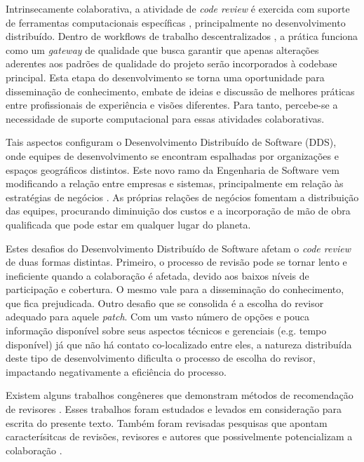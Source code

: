 \documentclass[a4paper,12pt]{monografia}
\theoremstyle{plain}
\theoremstyle{definition}
\theoremstyle{remark}
\begin{document}
Intrinsecamente colaborativa, a atividade de \textit{code review} é exercida com suporte de ferramentas computacionais específicas \cite{Bacchelli2013}, principalmente no desenvolvimento distribuído. Dentro de workflows de trabalho descentralizados \cite{gousios2016}, a prática funciona como um \textit{gateway} de qualidade que busca garantir que apenas alterações aderentes aos padrões de qualidade do projeto serão incorporados à codebase principal. Esta etapa do desenvolvimento se torna uma oportunidade para disseminação de conhecimento, embate de ideias e discussão de melhores práticas entre profissionais de experiência e visões diferentes. Para tanto, percebe-se a necessidade de suporte computacional para essas atividades colaborativas.

Tais aspectos configuram o Desenvolvimento Distribuído de Software (DDS), onde equipes de desenvolvimento se encontram espalhadas por organizações e espaços geográficos distintos. Este novo ramo da Engenharia de Software vem modificando a relação entre empresas e sistemas, principalmente em relação às estratégias de negócios \cite{audy2007}. As próprias relações de negócios fomentam a distribuição das equipes, procurando diminuição dos custos e a incorporação de mão de obra qualificada que pode estar em qualquer lugar do planeta.


Estes desafios do Desenvolvimento Distribuído de Software afetam o \textit{code review} de duas formas distintas. Primeiro, o processo de revisão pode se tornar lento e ineficiente quando a colaboração é afetada, devido aos baixos níveis de participação e cobertura. O mesmo vale para a disseminação do conhecimento, que fica prejudicada. Outro desafio que se consolida é a escolha do revisor adequado para aquele \textit{patch}. Com um vasto número de opções e pouca informação disponível sobre seus aspectos técnicos e gerenciais (e.g. tempo disponível) já que não há contato co-localizado entre eles, a natureza distribuída deste tipo de desenvolvimento dificulta o processo de escolha do revisor, impactando negativamente a eficiência do processo.

Existem alguns trabalhos congêneres que demonstram métodos de recomendação de revisores \cite{yu2014,Xia2015261,jiang2017}. Esses trabalhos foram estudados e levados em consideração para escrita do presente texto. Também foram revisadas pesquisas que apontam caracterísitcas de revisões, revisores e autores que possivelmente potencializam a colaboração \cite{Kemerer2009,Bird2015191,Baysal2013122}.
\end{document}
